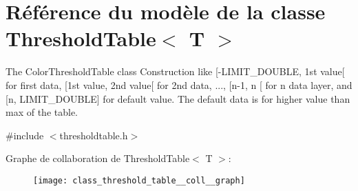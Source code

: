 \hypertarget{class_threshold_table}{}\section{Référence du modèle de la classe Threshold\+Table$<$ T $>$}
\label{class_threshold_table}


The Color\+Threshold\+Table class Construction like \mbox{[}-\/\+L\+I\+M\+I\+T\+\_\+\+D\+O\+U\+B\+LE, 1st value\mbox{[} for first data, \mbox{[}1st value, 2nd value\mbox{[} for 2nd data, ..., \mbox{[}n-\/1, n \mbox{[} for n data layer, and \mbox{[}n, L\+I\+M\+I\+T\+\_\+\+D\+O\+U\+B\+LE\mbox{]} for default value. The default data is for higher value than max of the table.  




{\ttfamily \#include $<$thresholdtable.\+h$>$}



Graphe de collaboration de Threshold\+Table$<$ T $>$\+:\nopagebreak
\begin{figure}[H]
\begin{center}
\leavevmode
\texttt{[image: class\_threshold\_table\_\_coll\_\_graph]}
\end{center}
\end{figure}
